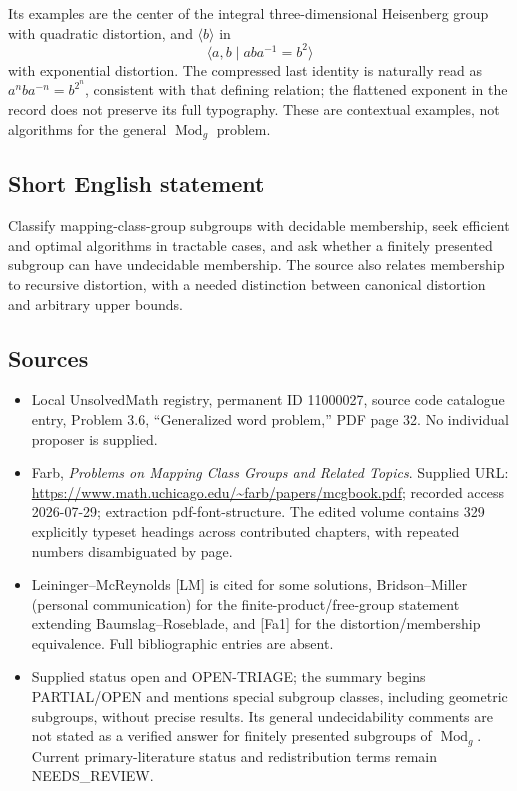 \documentclass[11pt]{article}
\begin{document}
Its examples are the center of the integral three-dimensional Heisenberg group with quadratic distortion, and \(\langle b\rangle\) in
\[
 \langle a,b\mid aba^{-1}=b^2\rangle
\]
with exponential distortion. The compressed last identity is naturally read as \(a^n b a^{-n}=b^{2^n}\), consistent with that defining relation; the flattened exponent in the record does not preserve its full typography. These are contextual examples, not algorithms for the general \(\operatorname{Mod}_g\) problem.
\subsection{Short English statement}
Classify mapping-class-group subgroups with decidable membership, seek efficient and optimal algorithms in tractable cases, and ask whether a finitely presented subgroup can have undecidable membership. The source also relates membership to recursive distortion, with a needed distinction between canonical distortion and arbitrary upper bounds.
\subsection{Sources}
\begin{itemize}
\item Local UnsolvedMath registry, permanent ID 11000027, source code catalogue entry, Problem 3.6, ``Generalized word problem,'' PDF page 32. No individual proposer is supplied.
\item Farb, \emph{Problems on Mapping Class Groups and Related Topics}. Supplied URL: \url{https://www.math.uchicago.edu/~farb/papers/mcgbook.pdf}; recorded access 2026-07-29; extraction pdf-font-structure. The edited volume contains 329 explicitly typeset headings across contributed chapters, with repeated numbers disambiguated by page.
\item Leininger--McReynolds [LM] is cited for some solutions, Bridson--Miller (personal communication) for the finite-product/free-group statement extending Baumslag--Roseblade, and [Fa1] for the distortion/membership equivalence. Full bibliographic entries are absent.
\item Supplied status open and OPEN-TRIAGE; the summary begins PARTIAL/OPEN and mentions special subgroup classes, including geometric subgroups, without precise results. Its general undecidability comments are not stated as a verified answer for finitely presented subgroups of \(\operatorname{Mod}_g\). Current primary-literature status and redistribution terms remain NEEDS\_REVIEW.
\end{itemize}
\end{document}
